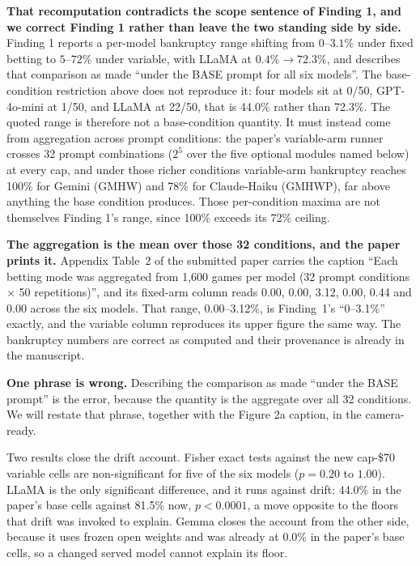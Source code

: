 \textbf{That recomputation contradicts the scope sentence of Finding 1, and we correct Finding 1
rather than leave the two standing side by side.} Finding 1 reports a per-model bankruptcy range
shifting from $0$--$3.1\%$ under fixed betting to $5$--$72\%$ under variable, with LLaMA at
$0.4\%\!\rightarrow\!72.3\%$, and describes that comparison as made ``under the BASE prompt for all
six models''. The base-condition restriction above does not reproduce it: four models sit at 0/50,
GPT-4o-mini at 1/50, and LLaMA at 22/50, that is 44.0\% rather than 72.3\%. The quoted range is
therefore not a base-condition quantity. It must instead come from aggregation across prompt
conditions: the paper's variable-arm runner crosses 32 prompt combinations ($2^5$ over the five
optional modules named below) at every cap, and under those richer conditions variable-arm
bankruptcy reaches 100\% for Gemini (GMHW) and 78\% for Claude-Haiku (GMHWP), far above anything
the base condition produces. Those per-condition maxima are not themselves Finding 1's range, since
100\% exceeds its 72\% ceiling.

\textbf{The aggregation is the mean over those 32 conditions, and the paper prints it.} Appendix
Table~2 of the submitted paper carries the caption ``Each betting mode was aggregated from 1{,}600
games per model (32 prompt conditions $\times$ 50 repetitions)'', and its fixed-arm column reads
0.00, 0.00, 3.12, 0.00, 0.44 and 0.00 across the six models. That range, 0.00--3.12\%, is
Finding~1's ``0--3.1\%'' exactly, and the variable column reproduces its upper figure the same way.
The bankruptcy numbers are correct as computed and their provenance is already in the manuscript.

\textbf{One phrase is wrong.} Describing the comparison as made ``under the BASE prompt'' is the
error, because the quantity is the aggregate over all 32 conditions. We will restate that phrase,
together with the Figure 2a caption, in the camera-ready.

Two results close the drift account. Fisher exact tests against the new cap-\$70 variable cells are
non-significant for five of the six models ($p = 0.20$ to $1.00$). LLaMA is the only significant
difference, and it runs against drift: 44.0\% in the paper's base cells against 81.5\% now,
$p < 0.0001$, a move opposite to the floors that drift was invoked to explain. Gemma closes the
account from the other side, because it uses frozen open weights and was already at 0.0\% in the
paper's base cells, so a changed served model cannot explain its floor.

